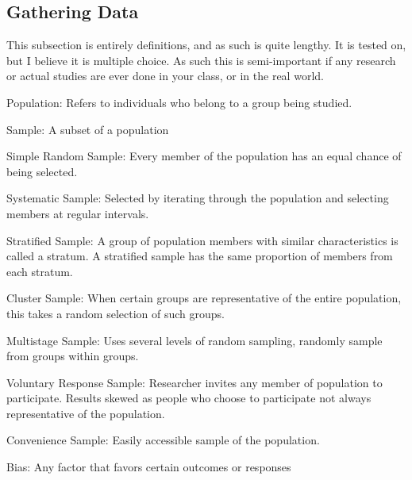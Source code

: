     \subsection{Gathering Data}
    This subsection is entirely definitions, and as such is quite lengthy. It is tested on, but I believe it is multiple choice. As such this is semi-important if any research or actual studies are ever done in your class, or in the real world. 
    \begin{definition}
        Population: Refers to individuals who belong to a group being studied. 
    \end{definition}
    \begin{definition}
        Sample: A subset of a population
    \end{definition}
    \begin{definition}
        Simple Random Sample: Every member of the population has an equal chance of being selected.  
    \end{definition}
    \begin{definition}
        Systematic Sample: Selected by iterating through the population and selecting members at regular intervals.   
    \end{definition}
    \begin{definition}
        Stratified Sample: A group of population members with similar characteristics is called a stratum. A stratified sample has the same proportion of members from each stratum. 
    \end{definition}
    \begin{definition}
        Cluster Sample: When certain groups are representative of the entire population, this takes a random selection of such groups. 
    \end{definition}
    \begin{definition}
        Multistage Sample: Uses several levels of random sampling, randomly sample from groups within groups. 
    \end{definition}
    \begin{definition}
        Voluntary Response Sample: Researcher invites any member of population to participate. Results skewed as people who choose to participate not always representative of the population.
    \end{definition}
    \begin{definition}
        Convenience Sample: Easily accessible sample of the population.
    \end{definition}
    \begin{definition}
        Bias: Any factor that favors certain outcomes or responses
    \end{definition}
